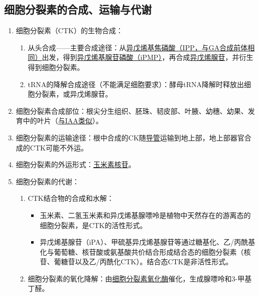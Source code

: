 \subsection{细胞分裂素的合成、运输与代谢}
\begin{enumerate}
    \item 细胞分裂素（CTK）的生物合成：
    \begin{enumerate}
        \item 从头合成——主要合成途径：从\uline{异戊烯基焦磷酸（IPP，与GA合成前体相同）}出发，得到\uline{异戊烯基腺苷磷酸（iPMP）}，再合成\uline{异戊烯腺苷}，并衍生得到细胞分裂素。
        \item tRNA的降解合成途径（不能满足细胞要求）：酵母tRNA降解时释放出细胞分裂素，或异戊烯腺苷。        
    \end{enumerate}
    \item 细胞分裂素合成部位：根尖分生组织、胚珠、韧皮部、叶腋、幼穗、幼果、发育中的叶片（\uline{与IAA类似}）。
    \item 细胞分裂素的运输途径：根中合成的CK随\uline{导管}运输到地上部，地上部器官合成的CTK可能不外运。
    \item 细胞分裂素的外运形式：\uline{玉米素核苷}。
    \item 细胞分裂素的代谢：
    \begin{enumerate}
        \item CTK结合物的合成和水解：
        \begin{itemize}
            \item 玉米素、二氢玉米素和异戊烯基腺嘌呤是植物中天然存在的游离态的细胞分裂素，是CTK的活性形式。
            \item 异戊烯基腺苷（iPA）、甲硫基异戊烯基腺苷等通过糖基化、乙/丙酰基化与葡萄糖、核苷酸或氨基酸共价结合形成结合态的细胞分裂素（核苷、葡糖苷以及乙/丙酰化CTK）。结合态CTK是非活性形式。
        \end{itemize}
        \item 细胞分裂素的氧化降解：由\uline{细胞分裂素氧化酶}催化，生成腺嘌呤和3-甲基丁醛。
    \end{enumerate}
\end{enumerate}
